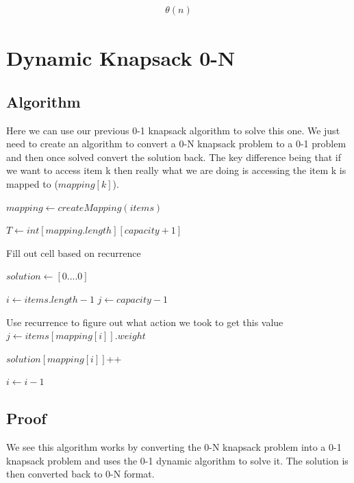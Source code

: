 \documentclass{article}
\begin{document}
			\begin{align}
				\theta(n)
			\end{align}				
		
		\break
		
	\section{Dynamic Knapsack 0-N}
		\subsection{Algorithm}
			Here we can use our previous 0-1 knapsack algorithm to solve this one. We just need to create an algorithm to convert a 0-N knapsack problem to a 0-1 problem and then once solved convert the solution back. The key difference being that if we want to access item k then really what we are doing is accessing the item k is mapped to ($mapping[k]$).
		
			\begin{algorithm}
				\begin{algorithmic}[1]
						\State $mapping \gets createMapping(items)$	
						
						\State $T \gets int[mapping.length][capacity+1]$
						
								\State Fill out cell based on recurrence
							\EndFor
						\EndFor
						
						\State $solution \gets [0....0]$ 						
						
						\State $i \gets items.length-1$
						\State $j \gets capacity-1$
						
						  
							\State Use recurrence to figure out what action we took to get this value
								\State $j \gets items[mapping[i]].weight$
								
								\State $solution[mapping[i]]$++
							\EndIf
							
							\State $i \gets i - 1$
						\EndWhile
					\EndProcedure
				\end{algorithmic}
			\end{algorithm}
		\subsection{Proof}
			We see this algorithm works by converting the 0-N knapsack problem into a 0-1 knapsack problem and uses the 0-1 dynamic algorithm to solve it. The solution is then converted back to 0-N format.\newline
			
\end{document}
